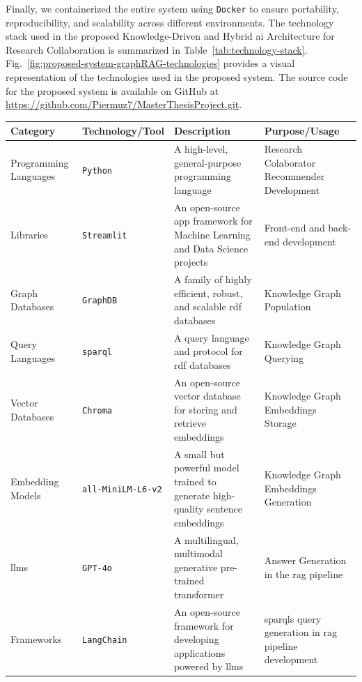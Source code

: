 Finally, we containerized the entire system using \texttt{Docker} to ensure portability, reproducibility, and scalability across different environments.
The technology stack used in the proposed Knowledge-Driven and Hybrid \gls{ai} Architecture for Research Collaboration is summarized in Table~\ref{tab:technology-stack}.
Fig.~\ref{fig:proposed-system-graphRAG-technologies} provides a visual representation of the technologies used in the proposed system.
The source code for the proposed system is available on GitHub at \url{https://github.com/Piermuz7/MasterThesisProject.git}.

\begin{table}[htbp]
    \centering
    \scriptsize
    \begin{tabularx}{\textwidth}{|>{\centering\arraybackslash}p{2cm}|>{\centering\arraybackslash}p{2.5cm}|X|X|}
      \hline
      \textbf{Category} & \textbf{Technology/Tool} & \textbf{Description} & \textbf{Purpose/Usage} \\
        \hline
        Programming Languages & \texttt{Python} & A high-level, general-purpose programming language & Research Colaborator Recommender Development\\
        \hline
        Libraries & \texttt{Streamlit} & An open-source app framework for Machine Learning and Data Science projects & Front-end and back-end development\\
        \hline
        Graph Databases & \texttt{GraphDB} & A family of highly efficient, robust, and scalable \gls{rdf} databases & Knowledge Graph Population\\
        \hline
        Query Languages & \texttt{\gls{sparql}} & A query language and protocol for \gls{rdf} databases & Knowledge Graph Querying\\
        \hline
        Vector Databases & \texttt{Chroma} & An open-source vector database for storing and retrieve embeddings & Knowledge Graph Embeddings Storage\\
        \hline
        Embedding Models & \texttt{all-MiniLM-L6-v2} & A small but powerful model trained to generate high-quality sentence embeddings & Knowledge Graph Embeddings Generation\\
        \hline
        \glspl{llm} & \texttt{GPT-4o} & A multilingual, multimodal generative pre-trained transformer & Answer Generation in the \gls{rag} pipeline\\
        \hline
        Frameworks & \texttt{LangChain} & An open-source framework for developing applications powered by \glspl{llm} & \glspl{sparql} query generation in \gls{rag} pipeline development\\

\end{tabularx}
\end{table}
